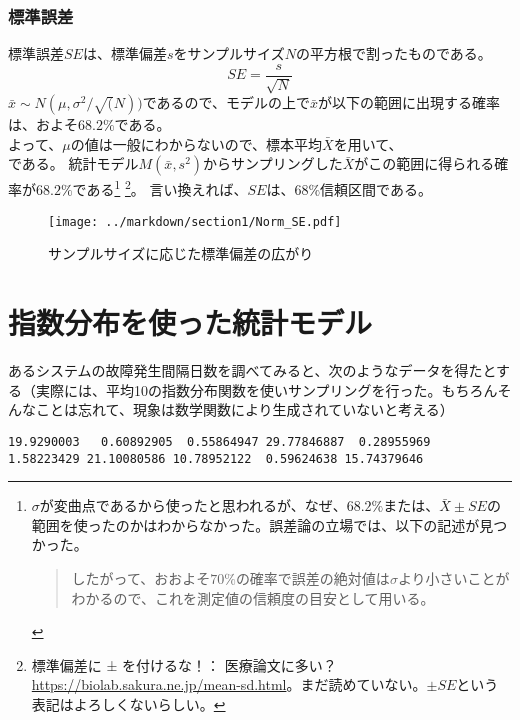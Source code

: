 \documentclass[a4paper,11pt,dvipdfmx]{jsarticle}
\begin{document}
\subsubsection{標準誤差}
標準誤差$SE$は、標準偏差$s$をサンプルサイズ$N$の平方根で割ったものである。
\begin{equation*}
    SE = \frac{s}{\sqrt{N}}
\end{equation*}
$\bar{x}\sim N(\mu,\sigma^2/\sqrt(N))$であるので、モデルの上で$\bar{x}$が以下の範囲に出現する確率は、およそ$68.2\%$である。
\begin{equation*}
    [\bar{\mu}-SE,\bar{\mu}+SE]
\end{equation*}
よって、$\mu$の値は一般にわからないので、標本平均$\bar{X}$を用いて、
\begin{equation*}
    [\bar{X}-SE,\bar{X}+SE]
\end{equation*}
である。
統計モデル$M(\bar{x},s^2)$からサンプリングした$\bar{X}$がこの範囲に得られる確率が$68.2\%$である\footnote{$\sigma$が変曲点であるから使ったと思われるが、なぜ、$68.2\%$または、$\bar{X}\pm SE$の範囲を使ったのかはわからなかった。誤差論の立場では、以下の記述が見つかった\cite{誤差の取り扱い_神戸大学}。
\begin{quote}
    したがって、おおよそ$70\%$の確率で誤差の絶対値は$\sigma$より小さいことがわかるので、これを測定値の信頼度の目安として用いる。
\end{quote}
}
\footnote{標準偏差に ± を付けるな！： 医療論文に多い？
\url{https://biolab.sakura.ne.jp/mean-sd.html}。まだ読めていない。$\pm SE$という表記はよろしくないらしい。}。
言い換えれば、$SE$は、$68\%$信頼区間である。


\begin{figure}
    \begin{center}
        \texttt{[image: ../markdown/section1/Norm\_SE.pdf]}
        \caption{サンプルサイズに応じた標準偏差の広がり}
    \end{center}
\end{figure}



\section{指数分布を使った統計モデル}
あるシステムの故障発生間隔日数を調べてみると、次のようなデータを得たとする（実際には、平均10の指数分布関数を使いサンプリングを行った。もちろんそんなことは忘れて、現象は数学関数により生成されていないと考える）
\begin{lstlisting}
19.9290003   0.60892905  0.55864947 29.77846887  0.28955969  1.58223429 21.10080586 10.78952122  0.59624638 15.74379646
\end{lstlisting}
\end{document}
